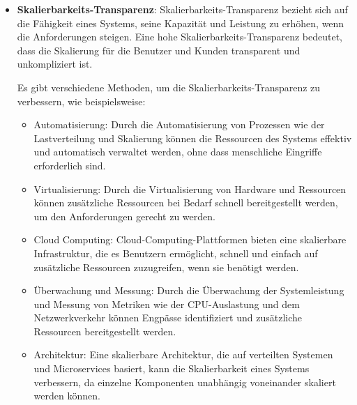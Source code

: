 \begin{itemize}
\item \textbf{Skalierbarkeits-Transparenz}: Skalierbarkeits-Transparenz bezieht sich auf die Fähigkeit eines Systems, seine Kapazität und Leistung zu erhöhen, wenn die Anforderungen steigen. Eine hohe Skalierbarkeits-Transparenz bedeutet, dass die Skalierung für die Benutzer und Kunden transparent und unkompliziert ist.

Es gibt verschiedene Methoden, um die Skalierbarkeits-Transparenz zu verbessern, wie beispielsweise:
\begin{itemize}
\item Automatisierung: Durch die Automatisierung von Prozessen wie der Lastverteilung und Skalierung können die Ressourcen des Systems effektiv und automatisch verwaltet werden, ohne dass menschliche Eingriffe erforderlich sind.
\item Virtualisierung: Durch die Virtualisierung von Hardware und Ressourcen können zusätzliche Ressourcen bei Bedarf schnell bereitgestellt werden, um den Anforderungen gerecht zu werden.
\item Cloud Computing: Cloud-Computing-Plattformen bieten eine skalierbare Infrastruktur, die es Benutzern ermöglicht, schnell und einfach auf zusätzliche Ressourcen zuzugreifen, wenn sie benötigt werden.
\item Überwachung und Messung: Durch die Überwachung der Systemleistung und Messung von Metriken wie der CPU-Auslastung und dem Netzwerkverkehr können Engpässe identifiziert und zusätzliche Ressourcen bereitgestellt werden.
\item Architektur: Eine skalierbare Architektur, die auf verteilten Systemen und Microservices basiert, kann die Skalierbarkeit eines Systems verbessern, da einzelne Komponenten unabhängig voneinander skaliert werden können.
\end{itemize}

\end{itemize}	
